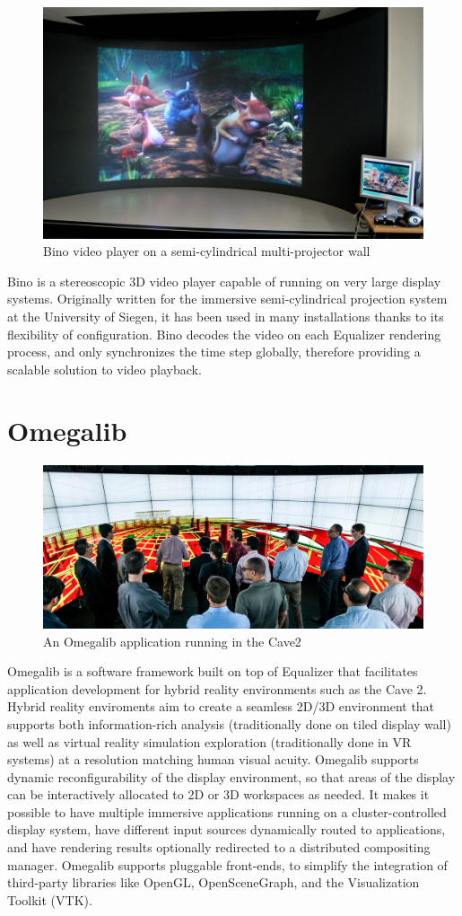 \begin{figure}
  \includegraphics[width=.618\textwidth]{images/bino}
  {\caption{\label{fBino}Bino video player on a semi-cylindrical multi-projector wall}}
\end{figure}

Bino is a stereoscopic 3D video player capable of running on very large display
systems. Originally written for the immersive semi-cylindrical projection
system at the University of Siegen, it has been used in many installations
thanks to its flexibility of configuration. Bino decodes the video on each
Equalizer rendering process, and only synchronizes the time step globally,
therefore providing a scalable solution to video playback.

\section{Omegalib}

\begin{figure}
  \includegraphics[width=.618\textwidth]{images/omegalib}
  {\caption{\label{fOmegalib}An Omegalib application running in the Cave2}}
\end{figure}

Omegalib \cite{Omegalib} is a software framework built on top of Equalizer that
facilitates application development for hybrid reality environments such as the
Cave 2. Hybrid reality enviroments aim to create a seamless 2D/3D environment
that supports both information-rich analysis (traditionally done on tiled
display wall) as well as virtual reality simulation exploration (traditionally
done in VR systems) at a resolution matching human visual acuity. Omegalib
supports dynamic reconfigurability of the display environment, so that areas of
the display can be interactively allocated to 2D or 3D workspaces as needed. It
makes it possible to have multiple immersive applications running on a
cluster-controlled display system, have different input sources dynamically
routed to applications, and have rendering results optionally redirected to a
distributed compositing manager. Omegalib supports pluggable front-ends, to
simplify the integration of third-party libraries like OpenGL, OpenSceneGraph,
and the Visualization Toolkit (VTK).


